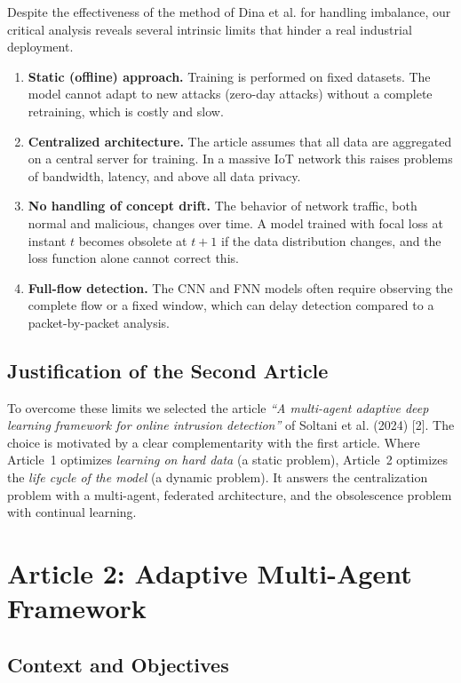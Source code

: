 \documentclass[11pt,a4paper]{article}
\begin{document}
Despite the effectiveness of the method of Dina et al. for handling imbalance, our critical analysis reveals several intrinsic limits that hinder a real industrial deployment.

\begin{enumerate}[leftmargin=1.4em,itemsep=2pt]
\item \textbf{Static (offline) approach.} Training is performed on fixed datasets. The model cannot adapt to new attacks (zero-day attacks) without a complete retraining, which is costly and slow.
\item \textbf{Centralized architecture.} The article assumes that all data are aggregated on a central server for training. In a massive IoT network this raises problems of bandwidth, latency, and above all data privacy.
\item \textbf{No handling of concept drift.} The behavior of network traffic, both normal and malicious, changes over time. A model trained with focal loss at instant $t$ becomes obsolete at $t+1$ if the data distribution changes, and the loss function alone cannot correct this.
\item \textbf{Full-flow detection.} The CNN and FNN models often require observing the complete flow or a fixed window, which can delay detection compared to a packet-by-packet analysis.
\end{enumerate}

\subsection{Justification of the Second Article}

To overcome these limits we selected the article \emph{``A multi-agent adaptive deep learning framework for online intrusion detection''} of Soltani et al. (2024) [2]. The choice is motivated by a clear complementarity with the first article. Where Article~1 optimizes \emph{learning on hard data} (a static problem), Article~2 optimizes the \emph{life cycle of the model} (a dynamic problem). It answers the centralization problem with a multi-agent, federated architecture, and the obsolescence problem with continual learning.

\section{Article 2: Adaptive Multi-Agent Framework}

\subsection{Context and Objectives}
\end{document}
